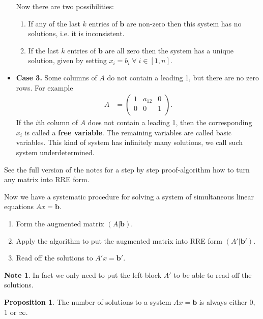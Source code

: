 \documentclass[11pt,a4paper]{article}
\theoremstyle{definition}
\newtheorem{note}{Note}
\newtheorem{proposition}{Proposition}
\begin{document}
\begin{itemize}
    Now there are two possibilities:
    \begin{enumerate}
        \item If any of the last $k$ entries of $\textbf{b}$ are non-zero then this system has no solutions, i.e. it is inconsistent.
        \item If the last $k$ entries of $\textbf{b}$ are all zero then the system has a unique solution, given by setting $ x_i = b_i \;\forall \; i \in [1, n] $.
    \end{enumerate}
    \item \textbf{Case 3.} Some columns of $A$ do not contain a leading 1, but there are no zero rows. For example
    \begin{align}
        A &= \begin{pmatrix}
            1 & a_{12} & 0 \\
            0 & 0 & 1 \\
        \end{pmatrix}.
    \end{align}
    If the $i$th column of $A$ does not contain a leading 1, then the corresponding $x_i$ is called a \textbf{free variable}. 
    The remaining variables are called basic variables. This kind of system has infinitely many solutions, we call such system underdetermined.
\end{itemize}

See the full version of the notes for a step by step proof-algorithm how to turn any matrix into RRE form.

Now we have a systematic procedure for solving a system of simultaneous linear equations $Ax = \textbf{b}$.
\begin{enumerate}
    \item Form the augmented matrix $(A|\textbf{b})$.
    \item Apply the algorithm to put the augmented matrix into RRE form $(A'|\textbf{b}')$.
    \item Read off the solutions to $A'x = \textbf{b}'$.
\end{enumerate}
\begin{note}
    In fact we only need to put the left block $A'$ to be able to read off the solutions.
\end{note}

\begin{proposition}
    The number of solutions to a system $Ax = \textbf{b}$ is always either 0, 1 or $\infty$. 
\end{proposition}
\end{document}
